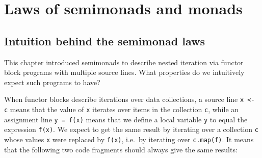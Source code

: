 \begin{comment}
some elementary step of computation that deals with some kind of context
together with a new value and we want this elementary step of the
computation to be usable under flatmap in other words the type of
this elementary step of the computation must be of the kind a to FB
where F is the function that is the type of the argument of want map
so systematically we demanded that the type was of that kind and that
allowed us straightforwardly to derive the types of these moments
you need to get used to these moments in order to be proficient with
them but I hope that this derivation kind of lifts the veil of mystery
from the question of why are the types of that\textsf{'}s chosen like this
and what is this context and they manipulate here are some exercises
for you to get more familiar with using walnuts and to implement simple
examples using set sequence future lists or try and state units as
well as implementing semi modded instances which means simply implementing
flatmap for certain type instructors that concludes part 1 of chapter
7
\end{comment}


\section{Laws of semimonads and monads}

\subsection{Intuition behind the semimonad laws}

This chapter introduced semimonads to describe nested iteration via
functor block programs with multiple source lines. What properties
do we intuitively expect such programs to have?

When functor blocks describe iterations over data collections, a source
line \lstinline!x <- c! means that the value of \lstinline!x! iterates
over items in the collection \lstinline!c!, while an assignment line
\lstinline!y = f(x)! means that we define a local variable \lstinline!y!
to equal the expression \lstinline!f(x)!. We expect to get the same
result by iterating over a collection \lstinline!c! whose values
\lstinline!x! were replaced by \lstinline!f(x)!, i.e.~by iterating
over \lstinline!c.map(f)!. It means that the following two code fragments
should always give the same results:

\vspace{0.3\baselineskip}

